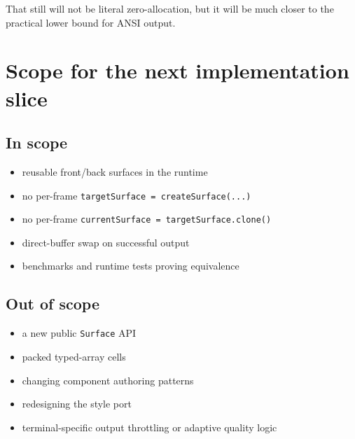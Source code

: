 That still will not be literal zero-allocation, but it will be much closer to the practical lower bound for ANSI output.

\section{Scope for the next implementation slice}\label{record-052-scope-for-the-next-implementation-slice}

\subsection{In scope}\label{record-052-in-scope}

\begin{itemize}
\tightlist
\item
  reusable front/back surfaces in the runtime
\item
  no per-frame \texttt{t\allowbreak{}a\allowbreak{}r\allowbreak{}g\allowbreak{}e\allowbreak{}t\allowbreak{}S\allowbreak{}u\allowbreak{}r\allowbreak{}f\allowbreak{}a\allowbreak{}c\allowbreak{}e\allowbreak{} \allowbreak{}=\allowbreak{} \allowbreak{}c\allowbreak{}r\allowbreak{}e\allowbreak{}a\allowbreak{}t\allowbreak{}e\allowbreak{}S\allowbreak{}u\allowbreak{}r\allowbreak{}f\allowbreak{}a\allowbreak{}c\allowbreak{}e\allowbreak{}(\allowbreak{}.\allowbreak{}.\allowbreak{}.\allowbreak{})}
\item
  no per-frame \texttt{c\allowbreak{}u\allowbreak{}r\allowbreak{}r\allowbreak{}e\allowbreak{}n\allowbreak{}t\allowbreak{}S\allowbreak{}u\allowbreak{}r\allowbreak{}f\allowbreak{}a\allowbreak{}c\allowbreak{}e\allowbreak{} \allowbreak{}=\allowbreak{} \allowbreak{}t\allowbreak{}a\allowbreak{}r\allowbreak{}g\allowbreak{}e\allowbreak{}t\allowbreak{}S\allowbreak{}u\allowbreak{}r\allowbreak{}f\allowbreak{}a\allowbreak{}c\allowbreak{}e\allowbreak{}.\allowbreak{}c\allowbreak{}l\allowbreak{}o\allowbreak{}n\allowbreak{}e\allowbreak{}(\allowbreak{})}
\item
  direct-buffer swap on successful output
\item
  benchmarks and runtime tests proving equivalence
\end{itemize}

\subsection{Out of scope}\label{record-052-out-of-scope}

\begin{itemize}
\tightlist
\item
  a new public \texttt{S\allowbreak{}u\allowbreak{}r\allowbreak{}f\allowbreak{}a\allowbreak{}c\allowbreak{}e} API
\item
  packed typed-array cells
\item
  changing component authoring patterns
\item
  redesigning the style port
\item
  terminal-specific output throttling or adaptive quality logic
\end{itemize}

